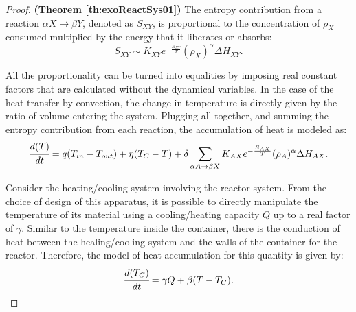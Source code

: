 \documentclass[a4paper,11pt]{book}
\numberwithin{figure}{chapter}
\numberwithin{equation}{chapter}
\numberwithin{table}{chapter}
\theoremstyle{definition}
\begin{document}
\begin{proof}{\textbf{(Theorem \ref{th:exoReactSys01})}}
    The entropy contribution from a reaction $\alpha X \rightarrow \beta Y$, denoted as $S_{XY}$, is proportional to the concentration of $\rho_X$ consumed multiplied by the energy that it liberates or absorbs:
    \begin{equation}
        S_{XY} \sim K_{XY} e^{-\frac{E_{XY}}{T}} (\rho_X)^{\alpha} \Delta H_{XY}
    .\end{equation}

    All the proportionality can be turned into equalities by imposing real constant factors that are calculated without the dynamical variables. In the case of the heat transfer by convection, the change in temperature is directly given by the ratio of volume entering the system. Plugging all together, and summing the entropy contribution from each reaction, the  accumulation of heat is modeled as:
    \begin{equation}
        \cfrac{d(T)}{dt} = q(T_{in} - T_{out}) + \eta (T_C - T) + \delta \sum_{\alpha A \rightarrow \beta X} K_{AX} e^{-\frac{E_{AX}}{T}} (\rho_A)^{\alpha} \Delta H_{AX}
    .\end{equation}
    
    Consider the heating/cooling system involving the reactor system. From the choice of design of this apparatus, it is possible to directly manipulate the temperature of its material using a cooling/heating capacity $Q$ up to a real factor of $\gamma$. Similar to the temperature inside the container, there is the conduction of heat between the healing/cooling system and the walls of the container for the reactor. Therefore, the model of heat accumulation for this quantity is given by:
    \begin{equation}
        \cfrac{d(T_C)}{dt} = \gamma Q + \beta (T - T_C)
    .\end{equation}
\end{proof}
\end{document}
